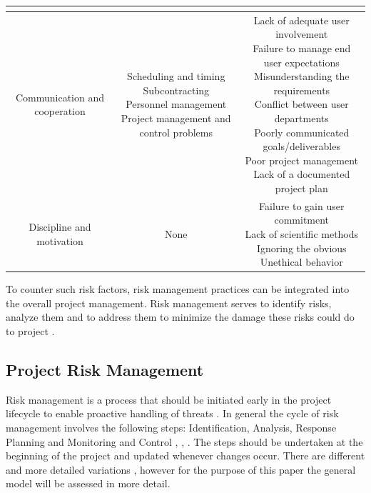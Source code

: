 \begin{table}[H]
{\begin{tabular}{c|c|c}
{		}\\  \hline
		Communication and cooperation &
		\makecell{
			Scheduling and timing\\
			Subcontracting \\
			Personnel management\\
			Project management and control problems\\
		}&
		\makecell{
			Lack of adequate user involvement\\
			Failure to manage end user expectations\\
			Misunderstanding the requirements\\
			Conflict between user departments\\
			Poorly communicated goals/deliverables\\
			Poor project management\\
			Lack of a documented project plan\\
		} \\ \hline
		Discipline and motivation &
		\makecell{
			None\\
		}&
		\makecell{
			Failure to gain user commitment\\
			Lack of scientific methods\\
			Ignoring the obvious\\
			Unethical behavior\\
		} \\ \hline
	\end{tabular}}
	\label{tab:riskfactorscategorization}
\end{table}
To counter such risk factors, risk management practices can be integrated into the overall project management. Risk management serves to identify risks, analyze them and to address them to minimize the damage these risks could do to project \cite{teschITProjectRisk2007}.

\subsection{Project Risk Management}
\label{sec:theoryAc}
Risk management is a process that should be initiated early in the project lifecycle to enable proactive handling of threats \cite{islamSoftwareDevelopmentRisk2011}. In general the cycle of risk management involves the following steps: Identification, Analysis, Response Planning and Monitoring and Control \cite{islamSoftwareDevelopmentRisk2011}, \cite{teschITProjectRisk2007}, \cite{didragaRoleEffectsRisk2013}. The steps should be undertaken at the beginning of the project and updated whenever changes occur. There are different and more detailed variations \cite{teschITProjectRisk2007}, however for the purpose of this paper the general model will be assessed in more detail.

